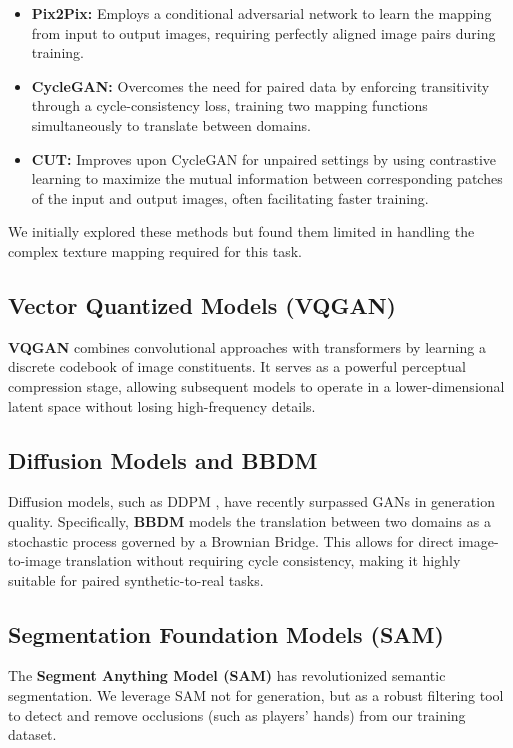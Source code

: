 \documentclass[12pt,a4paper]{article}
\begin{document}
\begin{itemize}
    \item \textbf{Pix2Pix:} Employs a conditional adversarial network to learn the mapping from input to output images, requiring perfectly aligned image pairs during training.
    
    \item \textbf{CycleGAN:} Overcomes the need for paired data by enforcing transitivity through a cycle-consistency loss, training two mapping functions simultaneously to translate between domains.
    
    \item \textbf{CUT:} Improves upon CycleGAN for unpaired settings by using contrastive learning to maximize the mutual information between corresponding patches of the input and output images, often facilitating faster training.
\end{itemize}

We initially explored these methods but found them limited in handling the complex texture mapping required for this task.

\subsection{Vector Quantized Models (VQGAN)}
\textbf{VQGAN} \cite{vqgan2021} combines convolutional approaches with transformers by learning a discrete codebook of image constituents. It serves as a powerful perceptual compression stage, allowing subsequent models to operate in a lower-dimensional latent space without losing high-frequency details.

\subsection{Diffusion Models and BBDM}
Diffusion models, such as DDPM \cite{ddpm2020}, have recently surpassed GANs in generation quality. Specifically, \textbf{BBDM} \cite{bbdm2023} models the translation between two domains as a stochastic process governed by a Brownian Bridge. This allows for direct image-to-image translation without requiring cycle consistency, making it highly suitable for paired synthetic-to-real tasks.

\subsection{Segmentation Foundation Models (SAM)}
The \textbf{Segment Anything Model (SAM)} \cite{sam2023} has revolutionized semantic segmentation. We leverage SAM not for generation, but as a robust filtering tool to detect and remove occlusions (such as players' hands) from our training dataset.
\end{document}
